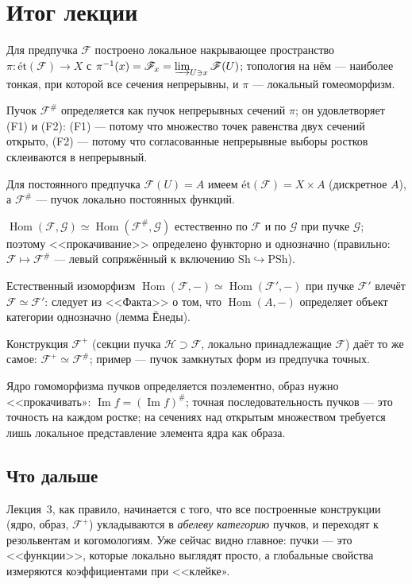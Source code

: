 \documentclass[11pt,b5paper]{article}
\newcommand{\et}{\text{ét}}
\newcommand{\Hom}{\operatorname{Hom}}
\newcommand{\Sh}{\mathrm{Sh}}
\newcommand{\PSh}{\mathrm{PSh}}
\newcommand{\Shv}[1]{\mathscr{#1}}   %
\newcommand{\dirlim}{\varinjlim}
\theoremstyle{plain}
\theoremstyle{definition}
\theoremstyle{remark}
\let\brutsection\section
\renewcommand{\section}{\Needspace{7\baselineskip}\brutsection}
\let\brutsubsection\subsection
\renewcommand{\subsection}{\Needspace{5\baselineskip}\brutsubsection}
\begin{document}
\section{Итог лекции}

\begin{conditions}
\item Для предпучка $\Shv{F}$ построено локальное накрывающее
 пространство $\pi\colon\et(\Shv{F})\to X$ с
 $\pi^{-1}(x)=\Shv{F}_x=\dirlim_{U\ni x}\Shv{F}(U)$; топология на нём
  --- наиболее тонкая, при которой все сечения непрерывны, и
 $\pi$ --- локальный гомеоморфизм.
\item Пучок $\Shv{F}^{\#}$ определяется как пучок непрерывных сечений
 $\pi$; он удовлетворяет (F1) и (F2): (F1) --- потому что множество
 точек равенства двух сечений открыто, (F2) --- потому что
 согласованные непрерывные выборы ростков склеиваются в
 непрерывный.
\item Для постоянного предпучка $\Shv{F}(U)=A$ имеем
 $\et(\Shv{F})=X\times A$ (дискретное $A$), а $\Shv{F}^{\#}$ ---
 пучок локально постоянных функций.
\item $\Hom(\Shv{F},\Shv{G})\simeq\Hom(\Shv{F}^{\#},\Shv{G})$
 естественно по $\Shv{F}$ и по $\Shv{G}$ при пучке $\Shv{G}$;
 поэтому <<прокачивание>> определено функторно и однозначно
 (правильно: $\Shv{F}\mapsto\Shv{F}^{\#}$ --- левый сопряжённый к
 включению $\Sh\hookrightarrow\PSh$).
\item Естественный изоморфизм $\Hom(\Shv{F},-)\simeq\Hom(\Shv{F}',-)$
 при пучке $\Shv{F}'$ влечёт $\Shv{F}\simeq\Shv{F}'$: следует из
 <<Факта>> о том, что $\Hom(A,-)$ определяет объект категории
 однозначно (лемма Ёнеды).
\item Конструкция $\Shv{F}^{+}$ (секции пучка $\Shv{H}\supset\Shv{F}$,
 локально принадлежащие $\Shv{F}$) даёт то же самое:
 $\Shv{F}^{+}\simeq\Shv{F}^{\#}$; пример --- пучок замкнутых форм из
 предпучка точных.
\item Ядро гомоморфизма пучков определяется поэлементно, образ нужно
 <<прокачивать»: $\operatorname{Im}f=(\operatorname{Im}f)^{\#}$;
  точная последовательность пучков --- это точность на каждом ростке;
  на сечениях над открытым множеством требуется лишь локальное
  представление элемента ядра как образа.
\end{conditions}

\subsection{Что дальше}
Лекция~3, как правило, начинается с того, что все построенные
конструкции (ядро, образ, $\Shv{F}^{+}$) укладываются в \emph{абелеву
категорию} пучков, и переходят к резольвентам и когомологиям. Уже сейчас
видно главное: пучки --- это <<функции>>, которые локально выглядят
просто, а глобальные свойства измеряются коэффициентами при
<<клейке».
\end{document}
